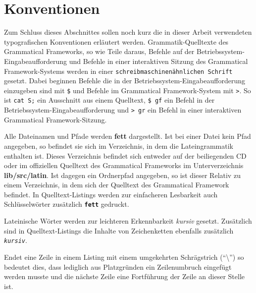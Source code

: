 \section{Konventionen}
Zum Schluss dieses Abschnittes sollen noch kurz die in dieser Arbeit verwendeten typografischen Konventionen erläutert werden. Grammatik-Quelltexte des Grammatical Frameworks, so wie Teile daraus, Befehle auf der Betriebssystem-Eingabeaufforderung und Befehle in einer interaktiven Sitzung des Grammatical Framework-Systems werden in einer \texttt{schreibmaschinenähnlichen Schrift} gesetzt. Dabei beginnen Befehle die in der Betriebssystem-Eingabeaufforderung einzugeben sind mit \texttt{\$} und Befehle im Grammatical Framework-System mit \texttt{>}. So ist \texttt{cat S;} ein Ausschnitt aus einem Quelltext, \texttt{\$ gf} ein Befehl in der Betriebssystem-Eingabeaufforderung und \texttt{> gr} ein Befehl in einer interaktiven Grammatical Framework-Sitzung. \par
Alle Dateinamen und Pfade werden \textbf{fett} dargestellt. Ist bei einer Datei kein Pfad angegeben, so befindet sie sich im Verzeichnis, in dem die Lateingrammatik enthalten ist. Dieses Verzeichnis befindet sich entweder auf der beiliegenden CD oder im offiziellen Quelltext des Grammatical Frameworks im Unterverzeichnis \textbf{lib/src/latin}. Ist dagegen ein Ordnerpfad angegeben, so ist dieser Relativ zu einem Verzeichnis, in dem sich der Quelltext des Grammatical Framework befindet. In Quelltext-Listings werden zur einfacheren Lesbarkeit auch Schlüsselwörter zusätzlich \texttt{\textbf{fett}} gedruckt.\par
Lateinische Wörter werden zur leichteren Erkennbarkeit \textit{kursiv} gesetzt. Zusätzlich sind in Quelltext-Listings die Inhalte von Zeichenketten ebenfalls zusätzlich \texttt{\textit{kursiv}}. \par
Endet eine Zeile in einem Listing mit einem umgekehrten Schrägstrich (``\textbackslash'') so bedeutet dies, dass lediglich aus Platzgründen ein Zeilenumbruch eingefügt werden musste und die nächste Zeile eine Fortführung der Zeile an dieser Stelle ist.